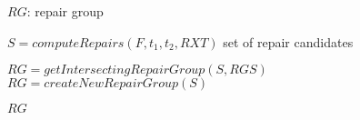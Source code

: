 \begin{algorithm}
\caption{$computeRepairGroup(F, t_1, t_2, RXT, RGS)$}
\label{repairGroupAlgo}
\begin{algorithmic}[1]
\ENSURE $RG$: repair group

\STATE $S = computeRepairs(F, t_1, t_2, RXT)$ \COMMENT set of repair candidates

\STATE $RG = getIntersectingRepairGroup(S, RGS)$
\ELSE
\STATE $RG = createNewRepairGroup(S)$
\ENDIF

\RETURN $RG$
\end{algorithmic}
\end{algorithm}
